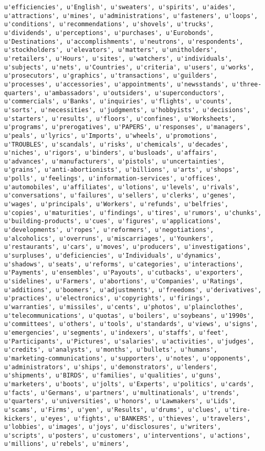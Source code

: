 \documentclass{article}
\begin{document}
\begin{Verbatim}[commandchars=\\\{\}]
u'efficiencies', u'English', u'sweaters', u'spirits', u'aides', u'attractions', u'mines', u'administrations', u'fasteners', u'loops', u'conditions', u'recommendations', u'shovels', u'trucks', u'dividends', u'perceptions', u'purchases', u'Eurobonds', u'Destinations', u'accomplishments', u'neutrons', u'respondents', u'stockholders', u'elevators', u'matters', u'unitholders', u'retailers', u'Hours', u'sites', u'watchers', u'individuals', u'subjects', u'nets', u'Countries', u'criteria', u'users', u'works', u'prosecutors', u'graphics', u'transactions', u'guilders', u'processes', u'accessories', u'appointments', u'newsstands', u'three-quarters', u'ambassadors', u'outsiders', u'superconductors', u'commercials', u'Banks', u'inquiries', u'flights', u'counts', u'sorts', u'necessities', u'judgments', u'hobbyists', u'decisions', u'starters', u'results', u'floors', u'confines', u'Worksheets', u'programs', u'prerogatives', u'PAPERS', u'responses', u'managers', u'peals', u'lyrics', u'Imports', u'wheels', u'promotions', u'TROUBLES', u'scandals', u'risks', u'chemicals', u'decades', u'niches', u'rigors', u'binders', u'busloads', u'affairs', u'advances', u'manufacturers', u'pistols', u'uncertainties', u'grains', u'anti-abortionists', u'billions', u'arts', u'shops', u'polls', u'feelings', u'information-services', u'offices', u'automobiles', u'affiliates', u'lotions', u'levels', u'rivals', u'conversations', u'failures', u'sellers', u'clerks', u'genes', u'wages', u'principals', u'Workers', u'refunds', u'belfries', u'copies', u'maturities', u'findings', u'tires', u'rumors', u'chunks', u'building-products', u'cues', u'figures', u'applications', u'developments', u'ropes', u'reformers', u'negotiations', u'alcoholics', u'overruns', u'miscarriages', u'Younkers', u'restaurants', u'cars', u'moves', u'producers', u'investigations', u'surpluses', u'deficiencies', u'Individuals', u'dynamics', u'shadows', u'seats', u'reforms', u'categories', u'interactions', u'Payments', u'ensembles', u'Payouts', u'cutbacks', u'exporters', u'sidelines', u'Farmers', u'abortions', u'Companies', u'Ratings', u'additions', u'boomers', u'adjustments', u'freedoms', u'derivatives', u'practices', u'electronics', u'copyrights', u'firings', u'warranties', u'missiles', u'cents', u'photos', u'plainclothes', u'telecommunications', u'quotas', u'boilers', u'soybeans', u'1990s', u'committees', u'others', u'tools', u'standards', u'views', u'signs', u'emergencies', u'segments', u'indexers', u'staffs', u'feet', u'Participants', u'Pictures', u'salaries', u'activities', u'judges', u'credits', u'analysts', u'months', u'bullets', u'humans', u'marketing-communications', u'supporters', u'notes', u'opponents', u'administrators', u'ships', u'demonstrators', u'lenders', u'shipments', u'BIRDS', u'families', u'qualities', u'guns', u'marketers', u'boots', u'jolts', u'Experts', u'politics', u'cards', u'facts', u'Germans', u'partners', u'multinationals', u'trends', u'quarters', u'universities', u'honors', u'Lawmakers', u'Lids', u'scams', u'Firms', u'yen', u'Results', u'drums', u'clues', u'tire-kickers', u'eyes', u'fights', u'BANKERS', u'thieves', u'travelers', u'lobbies', u'images', u'joys', u'disclosures', u'writers', u'scripts', u'posters', u'customers', u'interventions', u'actions', u'millions', u'rebels', u'miners', 
\end{Verbatim}
\end{document}
